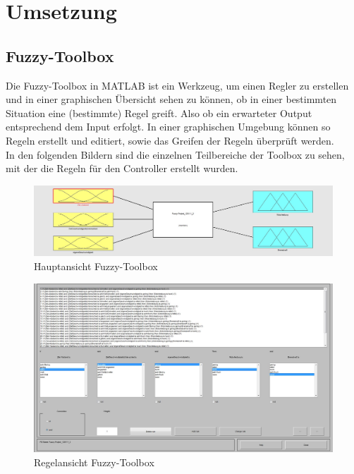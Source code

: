 \documentclass[10pt,a4paper]{article}
\begin{document}
\section{Umsetzung}

\subsection{Fuzzy-Toolbox}

Die Fuzzy-Toolbox in MATLAB ist ein Werkzeug, um einen Regler zu erstellen und in einer graphischen Übersicht sehen zu können, ob in einer bestimmten Situation eine (bestimmte) Regel greift. Also ob ein erwarteter Output entsprechend dem Input erfolgt. In einer graphischen Umgebung können so Regeln erstellt und editiert, sowie das Greifen der Regeln überprüft werden.\\
In den folgenden Bildern sind die einzelnen Teilbereiche der Toolbox zu sehen, mit der die Regeln für den Controller erstellt wurden.

\begin{figure}[htb]
\leavevmode
\includegraphics[width=\textwidth]{matlab1}
\caption[Hauptansicht]{Hauptansicht Fuzzy-Toolbox}
\label{matlab1}
\end{figure}

\begin{figure}[htb]
\leavevmode
\includegraphics[width=\textwidth]{matlab_regeln}
\caption[Ansicht Regeln]{Regelansicht Fuzzy-Toolbox}
\label{matlab_regeln}
\end{figure}
\end{document}
